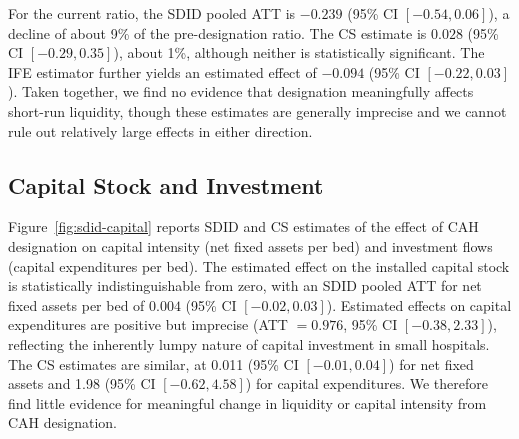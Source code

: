 \documentclass[a4paper, 12pt, twoside]{article}
\begin{document}
For the current ratio, the SDID pooled ATT is $-0.239$ (95\% CI $[-0.54, 0.06]$), a decline of about 9\% of the pre-designation ratio. The CS estimate is $0.028$ (95\% CI $[-0.29, 0.35]$), about 1\%, although neither is statistically significant. The IFE estimator further yields an estimated effect of $-0.094$ (95\% CI $[-0.22, 0.03]$). Taken together, we find no evidence that designation meaningfully affects short-run liquidity, though these estimates are generally imprecise and we cannot rule out relatively large effects in either direction.

\subsection{Capital Stock and Investment}
\label{sec:capital}
Figure~\ref{fig:sdid-capital} reports SDID and CS estimates of the effect of CAH designation on capital intensity (net fixed assets per bed) and investment flows (capital expenditures per bed). The estimated effect on the installed capital stock is statistically indistinguishable from zero, with an SDID pooled ATT for net fixed assets per bed of $0.004$ (95\% CI $[-0.02, 0.03]$). Estimated effects on capital expenditures are positive but imprecise (ATT $= 0.976$, 95\% CI $[-0.38, 2.33]$), reflecting the inherently lumpy nature of capital investment in small hospitals. The CS estimates are similar, at 0.011 (95\% CI $[-0.01, 0.04]$) for net fixed assets and 1.98 (95\% CI $[-0.62, 4.58]$) for capital expenditures. We therefore find little evidence for meaningful change in liquidity or capital intensity from CAH designation. 
\end{document}
